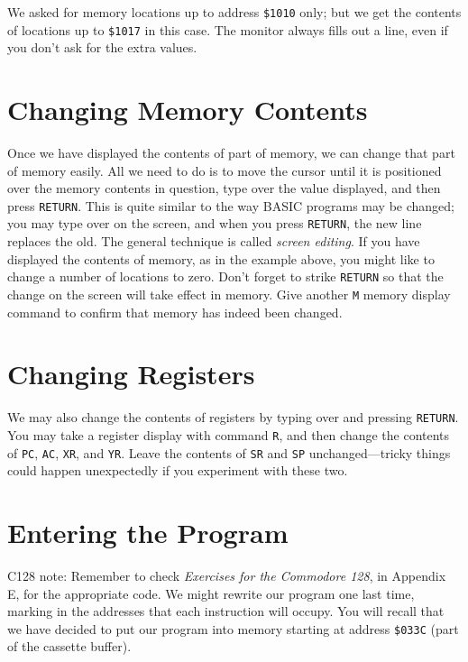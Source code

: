 \documentclass[11pt,a4paper,titlepage]{memoir}
\begin{document}
We asked for memory locations up to address \texttt{\$1010} only; but we get
the contents of locations up to \texttt{\$1017} in this case. The monitor always
fills out a line, even if you don't ask for the extra values.

\section{Changing Memory Contents}

Once we have displayed the contents of part of memory, we can change
that part of memory easily. All we need to do is to move the cursor until
it is positioned over the memory contents in question, type over the value
displayed, and then press \texttt{RETURN}.
This is quite similar to the way BASIC programs may be changed; you
may type over on the screen, and when you press \texttt{RETURN}, the new line
replaces the old. The general technique is called \emph{screen editing}.
If you have displayed the contents of memory, as in the example above,
you might like to change a number of locations to zero. Don't forget to
strike \texttt{RETURN} so that the change on the screen will take effect in memory. 
Give another \texttt{M} memory display command to confirm that memory
has indeed been changed.

\section{Changing Registers}

We may also change the contents of registers by typing over and pressing
\texttt{RETURN}. You may take a register display with command \texttt{R}, and then
change the contents of \texttt{PC}, \texttt{AC}, \texttt{XR}, and \texttt{YR}. Leave the contents of \texttt{SR}
and \texttt{SP} unchanged—tricky things could happen unexpectedly if you experiment with these two.

\section{Entering the Program}
C128 note: Remember to check \emph{Exercises for the Commodore 128}, in
Appendix E, for the appropriate code.
We might rewrite our program one last time, marking in the addresses
that each instruction will occupy. You will recall that we have decided to
put our program into memory starting at address \texttt{\$033C} (part of the
cassette buffer).\\
\end{document}
